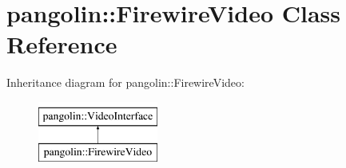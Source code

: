 \hypertarget{classpangolin_1_1_firewire_video}{}\section{pangolin\+:\+:Firewire\+Video Class Reference}
\label{classpangolin_1_1_firewire_video}
Inheritance diagram for pangolin\+:\+:Firewire\+Video\+:\begin{figure}[H]
\begin{center}
\leavevmode
\includegraphics[height=2.000000cm]{classpangolin_1_1_firewire_video}
\end{center}
\end{figure}
